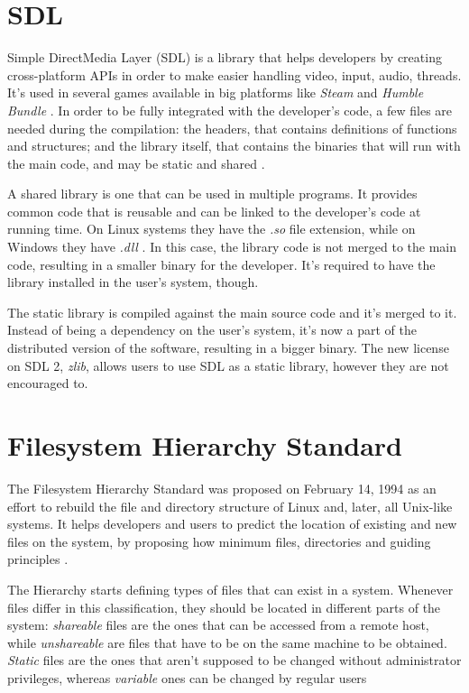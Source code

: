 \section{SDL}
\label {sec:sdl}

Simple DirectMedia Layer (SDL) is a library that helps developers by creating cross-platform APIs in order to make easier handling video, input, audio, threads. It's used in several games available in big platforms like \textit{Steam} and \textit{Humble Bundle} \cite{sdl2017}. In order to be fully integrated with the developer's code, a few files are needed during the compilation: the headers, that contains definitions of functions and structures; and the library itself, that contains the binaries that will run with the main code, and may be static and shared \cite{lazyfoo2017}.

A shared library is one that can be used in multiple programs. It provides common code that is reusable and can be linked to the developer's code at running time. On Linux systems they have the \textit{.so} file extension, while on Windows they have \textit{.dll} \cite{howto2017shared}. In this case, the library code is not merged to the main code, resulting in a smaller binary for the developer. It's required to have the library installed in the user's system, though.

The static library is compiled against the main source code and it's merged to it. Instead of being a dependency on the user's system, it's now a part of the distributed version of the software, resulting in a bigger binary. The new license on SDL 2, \textit{zlib}, allows users to use SDL as a static library, however they are not encouraged to.


\section{Filesystem Hierarchy Standard}
\label {sec:fhs}

The Filesystem Hierarchy Standard was proposed on February 14, 1994 as an effort to rebuild the file and directory structure of Linux and, later, all Unix-like systems. It helps developers and users to predict the location of existing and new files on the system, by proposing how minimum files, directories and guiding principles \cite{allbery2015filesystem}.

The Hierarchy starts defining types of files that can exist in a system. Whenever files differ in this classification, they should be located in different parts of the system: \textit{shareable} files are the ones that can be accessed from a remote host, while \textit{unshareable} are files that have to be on the same machine to be obtained. \textit{Static} files are the ones that aren't supposed to be changed without administrator privileges, whereas \textit{variable} ones can be changed by regular users \cite{allbery2015filesystem}


